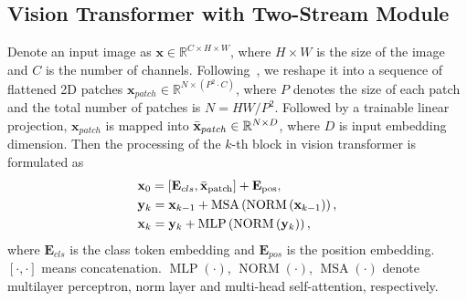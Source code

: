 \documentclass[letterpaper]{article} %
\begin{document}
\subsection{Vision Transformer with Two-Stream Module}
Denote an input image as $\mathbf{x} \in \mathbb{R}^{C \times H \times W}$, where $H\times W$ is the size of the image and $C$ is the number of channels.
Following~\cite{vit}, we reshape it into a sequence of flattened 2D patches $\mathbf{x}_{patch} \in \mathbb{R}^{N \times\left(P^{2} \cdot C\right)}$, where $P$ denotes the size of each patch and the total number of patches is $N=H W / P^{2}$.
Followed by a trainable linear projection, $\mathbf{x}_{patch}$ is mapped into $\Bar{\mathbf{x}}_{patch} \in \mathbb{R}^{N \times D}$, where $D$ is input embedding dimension.
Then the processing of the $k$-th block in vision transformer is formulated as
\begin{equation}
\begin{aligned}
&\mathbf{x}_{0}=\left[\mathbf{E}_{cls}, \Bar{\mathbf{x}}_{\text {patch}}\right]+\mathbf{E}_{\text {pos}}, \\
&\mathbf{y}_{k}=\mathbf{x}_{k-1}+\operatorname{MSA}\left(\operatorname{NORM}\left(\mathbf{x}_{k-1}\right)\right), \\
&\mathbf{x}_{k}=\mathbf{y}_{k}+\operatorname{MLP}\left(\operatorname{NORM}\left(\mathbf{y}_{k}\right)\right),
\end{aligned}
\end{equation}
where $\mathbf{E}_{cls}$ is the class token embedding and $\mathbf{E}_{pos}$ is the position embedding.
$\left[\cdot, \cdot\right]$ means concatenation.
$\operatorname{MLP}\left(\cdot\right)$, $\operatorname{NORM}\left(\cdot\right)$, $\operatorname{MSA}\left(\cdot\right)$ denote multilayer perceptron, norm layer and multi-head self-attention, respectively.
\end{document}
